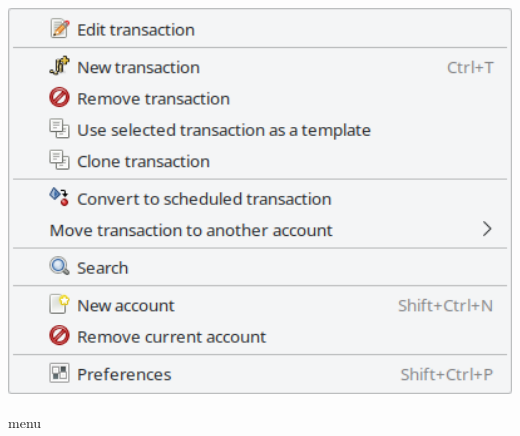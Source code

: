 \begin{minipage}{.3\linewidth}
	\vspace{-5pt}					%
	\centering						%
	\includegraphics[width=1\textwidth]{image/screenshot/home_menubar_edit}
	\vspace{-15pt}					%
	\captionsetup{
		type=figure,%
		name=Fig.,%
		labelsep=newline}			%
	\caption{ menu}	%
	\label{home_menubar_edit}
\end{minipage}

